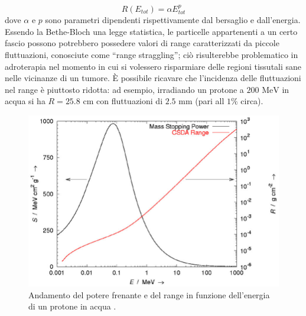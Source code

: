 \documentclass[12pt,a4paper,twoside]{report}
\begin{document}
	\begin{equation}
		R(E_{tot})=\alpha E_{tot}^p
		\label{eq:range_approx}
	\end{equation}
	dove $\alpha$ e $p$ sono parametri dipendenti rispettivamente dal bersaglio e dall'energia. Essendo la Bethe-Bloch una legge statistica, le particelle appartenenti a un certo fascio possono potrebbero possedere valori di range caratterizzati da piccole fluttuazioni, conosciute come ``range straggling''; ciò risulterebbe problematico in adroterapia nel momento in cui si volessero risparmiare delle regioni tissutali sane nelle vicinanze di un tumore. \`E possibile ricavare che l'incidenza delle fluttuazioni nel range è piuttosto ridotta: ad esempio, irradiando un protone a $200\mbox{ MeV}$ in acqua si ha $R=25.8\mbox{ cm}$ con fluttuazioni di $2.5\mbox{ mm}$ (pari all $1\%$ circa).
	\begin{figure}[H]
		\centering
		\includegraphics[width=0.9\linewidth]{adroterapic_range.png}
		\caption{Andamento del potere frenante e del range in funzione dell'energia di un protone in acqua \cite{NewhauserArticle}.}
		\label{fig:adroterapic_range}
	\end{figure}
	
\end{document}

